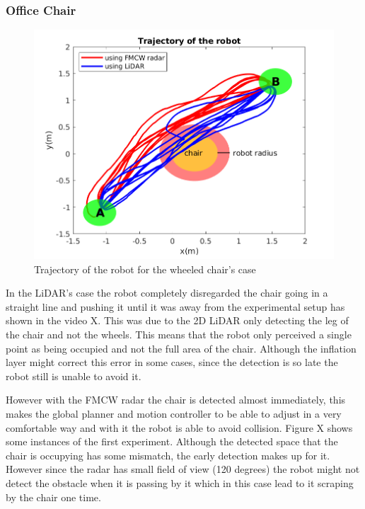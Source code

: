 \subsubsection{Office Chair}
\begin{figure}
\centerline{\includegraphics [width=0.7 \textwidth]{imgs/chapter5/traj1.png}}
\caption{Trajectory of the robot for the wheeled chair's case}
\label{fig:turlebot2}
\end{figure}

In the \ac{LiDAR}'s case  the robot completely disregarded the chair going in a straight line and pushing it until it was away from the experimental setup has shown in the video X. This was due to the 2D \ac{LiDAR} only detecting the leg of the chair and not the wheels. This means that the robot only perceived a single point as being occupied and not the full area of the chair. Although the inflation layer  might correct this error in some cases, since the detection is so late the robot still is unable to avoid it.

However with the \ac{FMCW} radar the chair is detected almost immediately, this makes the global planner and motion controller to be able to adjust in a very comfortable way and with it the robot is able to avoid collision. Figure X shows some instances of the first experiment. Although the detected space that the chair is occupying has some mismatch, the early detection makes up for it. However since the radar has small field of view (120 degrees) the robot might not detect the obstacle when it is passing by it which in this case lead to it scraping by the chair one time.
